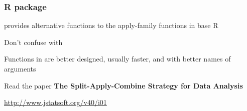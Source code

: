 \documentclass[12pt]{beamer}\usepackage[]{graphicx}\usepackage[]{color}
\begin{document}

\begin{frame}
\begin{center}
\Huge{}
\end{center}
\end{frame}


\begin{frame}
\frametitle{R package }

\bi
  \item {} provides alternative functions to the apply-family functions in base R
  \item Don't confuse  with 
  \item Functions in  are better designed, usually faster, and with better names of arguments
  \item Read the paper \textbf{The Split-Apply-Combine Strategy for Data Analysis}
  \item \url{http://www.jstatsoft.org/v40/i01}
\ei

\end{frame}

\end{document}

